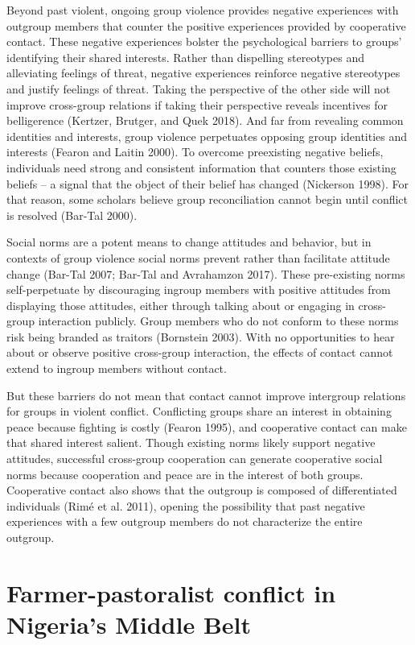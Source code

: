 \documentclass[11pt]{article}
\begin{document}
Beyond past violent, ongoing group violence provides negative
experiences with outgroup members that counter the positive experiences
provided by cooperative contact. These negative experiences bolster the
psychological barriers to groups' identifying their shared interests.
Rather than dispelling stereotypes and alleviating feelings of threat,
negative experiences reinforce negative stereotypes and justify feelings
of threat. Taking the perspective of the other side will not improve
cross-group relations if taking their perspective reveals incentives for
belligerence (Kertzer, Brutger, and Quek 2018). And far from revealing
common identities and interests, group violence perpetuates opposing
group identities and interests (Fearon and Laitin 2000). To overcome
preexisting negative beliefs, individuals need strong and consistent
information that counters those existing beliefs -- a signal that the
object of their belief has changed (Nickerson 1998). For that reason,
some scholars believe group reconciliation cannot begin until conflict
is resolved (Bar-Tal 2000).

Social norms are a potent means to change attitudes and behavior, but in
contexts of group violence social norms prevent rather than facilitate
attitude change (Bar-Tal 2007; Bar-Tal and Avrahamzon 2017). These
pre-existing norms self-perpetuate by discouraging ingroup members with
positive attitudes from displaying those attitudes, either through
talking about or engaging in cross-group interaction publicly. Group
members who do not conform to these norms risk being branded as traitors
(Bornstein 2003). With no opportunities to hear about or observe
positive cross-group interaction, the effects of contact cannot extend
to ingroup members without contact.

But these barriers do not mean that contact cannot improve intergroup
relations for groups in violent conflict. Conflicting groups share an
interest in obtaining peace because fighting is costly (Fearon 1995),
and cooperative contact can make that shared interest salient. Though
existing norms likely support negative attitudes, successful cross-group
cooperation can generate cooperative social norms because cooperation
and peace are in the interest of both groups. Cooperative contact also
shows that the outgroup is composed of differentiated individuals (Rimé
et al. 2011), opening the possibility that past negative experiences
with a few outgroup members do not characterize the entire outgroup.

\hypertarget{farmer-pastoralist-conflict-in-nigerias-middle-belt}{%
\section{Farmer-pastoralist conflict in Nigeria's Middle
Belt}\label{farmer-pastoralist-conflict-in-nigerias-middle-belt}}
\end{document}

